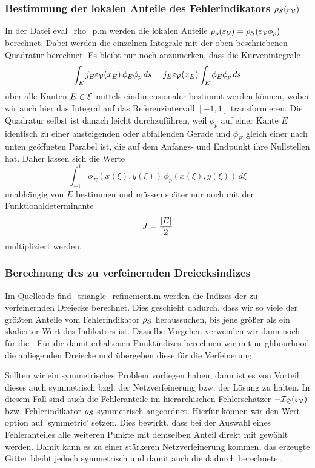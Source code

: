 \subsubsection{Bestimmung der lokalen Anteile des Fehlerindikators $\rho_{\mathcal S}(\varepsilon_{\mathcal V})$}

In der Datei {\ttfamily eval_rho_p.m} werden die lokalen Anteile $\rho_p (\varepsilon_{\mathcal V}) = \rho_{\mathcal S}(\varepsilon_{\mathcal V}\phi_p)$ berechnet. Dabei werden die einzelnen Integrale mit der oben beschriebenen Quadratur berechnet. Es bleibt nur noch anzumerken, dass die Kurvenintegrale
\[
	\int_E j_E \varepsilon_{\mathcal V}(x_E) \, \phi_E \phi_p \, ds = j_E \varepsilon_{\mathcal V}(x_E) \int_E \phi_E \phi_p \, ds
\]
über alle Kanten $E \in \mathcal E$ mittels eindimensionaler  bestimmt werden können, wobei wir auch hier das Integral auf das Referenzintervall $[-1,1]$ transformieren. Die Quadratur selbst ist danach leicht durchzuführen, weil $\phi_p$ auf einer Kante $E$ identisch zu einer ansteigenden oder abfallenden Gerade und $\phi_E$ gleich einer nach unten geöffneten Parabel ist, die auf dem Anfangs- und Endpunkt ihre Nullstellen hat. Daher lassen sich die Werte
\[
	\int_{-1}^1  \phi_E(x(\xi),y(\xi))  \, \phi_p(x(\xi),y(\xi)) \, d\xi
\]
unabhängig von $E$ bestimmen und müssen später nur noch mit der Funktionaldeterminante $$J=\frac{\lvert E\rvert}2$$ multipliziert werden.


\subsubsection{Berechnung des zu verfeinernden Dreiecksindizes}

Im Quellcode {\ttfamily find_triangle_refinement.m} werden die Indizes der zu verfeinernden Dreiecke berechnet. Dies geschieht dadurch, dass wir so viele der größten Anteile vom Fehlerindikator $\rho_{\mathcal S}$ heraussuchen, bis jene größer als ein skalierter Wert des Indikators ist. Dasselbe Vorgehen verwenden wir dann noch für die . Für die damit erhaltenen Punktindizes berechnen wir mit {\ttfamily neighbourhood} die anliegenden Dreiecke und übergeben diese für die Verfeinerung.

Sollten wir ein symmetrisches Problem vorliegen haben, dann ist es von Vorteil dieses auch symmetrisch bzgl. der Netzverfeinerung bzw. der Lösung zu halten. In diesem Fall sind auch die Fehleranteile im hierarchischen Fehlerschätzer $-\mathcal I_{\mathcal Q}(\varepsilon_{\mathcal V})$ bzw. Fehlerindikator $\rho_{\mathcal S}$ symmetrisch angeordnet. Hierfür können wir den Wert {\ttfamily option} auf {\ttfamily 'symmetric'} setzen. Dies bewirkt, dass bei der Auswahl eines Fehleranteiles alle weiteren Punkte mit demselben Anteil direkt mit gewählt werden. Damit kann es zu einer stärkeren Netzverfeinerung kommen, das erzeugte Gitter bleibt jedoch symmetrisch und damit auch die dadurch berechnete .



